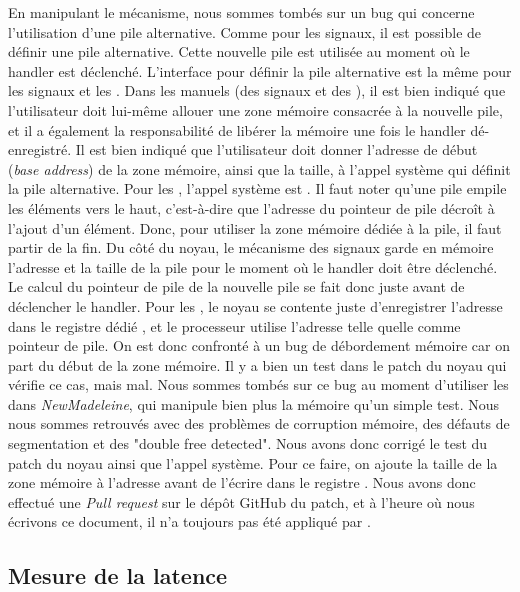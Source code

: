 En manipulant le mécanisme, nous sommes tombés sur un bug qui concerne l'utilisation d'une pile alternative.
Comme pour les signaux, il est possible de définir une pile alternative.
Cette nouvelle pile est utilisée au moment où le handler est déclenché.
L'interface pour définir la pile alternative est la même pour les signaux et les \uintr{}.
Dans les manuels (des signaux et des \uintr{}), il est bien indiqué que l'utilisateur doit lui-même allouer une zone mémoire consacrée à la nouvelle pile,
et il a également la responsabilité de libérer la mémoire une fois le handler dé-enregistré.
Il est bien indiqué que l'utilisateur doit donner l'adresse de début (\emph{base address}) de la zone mémoire,
ainsi que la taille, à l'appel système qui définit la pile alternative.
Pour les \uintr{}, l'appel système est .
Il faut noter qu'une pile empile les éléments vers le haut, c'est-à-dire que l'adresse du pointeur de pile décroît à l'ajout d'un élément.
Donc, pour utiliser la zone mémoire dédiée à la pile, il faut partir de la fin.
Du côté du noyau, le mécanisme des signaux garde en mémoire l'adresse et la taille de la pile pour le moment où le handler doit être déclenché.
Le calcul du pointeur de pile de la nouvelle pile se fait donc juste avant de déclencher le handler.
Pour les \uintr{}, le noyau se contente juste d'enregistrer l'adresse dans le registre dédié ,
et le processeur utilise l'adresse telle quelle comme pointeur de pile.
On est donc confronté à un bug de débordement mémoire car on part du début de la zone mémoire.
Il y a bien un test dans le patch du noyau qui vérifie ce cas, mais mal.
Nous sommes tombés sur ce bug au moment d'utiliser les \uintr{} dans \emph{NewMadeleine},
qui manipule bien plus la mémoire qu'un simple test.
Nous nous sommes retrouvés avec des problèmes de corruption mémoire, des défauts de segmentation et des "double free detected".
Nous avons donc corrigé le test du patch du noyau ainsi que l'appel système.
Pour ce faire, on ajoute la taille de la zone mémoire à l'adresse avant de l'écrire dans le registre .
Nous avons donc effectué une \emph{Pull request} \cite{pullRequestAltStackFix} sur le dépôt GitHub du patch,
et à l'heure où nous écrivons ce document, il n'a toujours pas été appliqué par \intel{}.

\subsection{Mesure de la latence}
\label{sec:latencyMesure}

